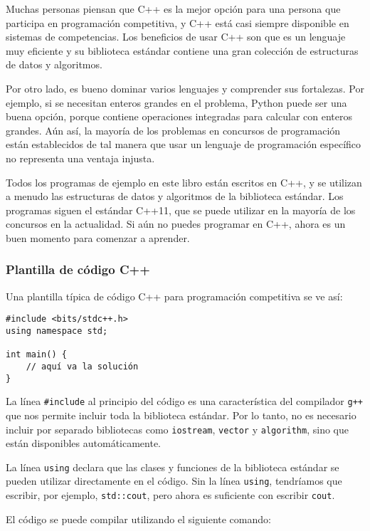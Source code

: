 Muchas personas piensan que C++ es la mejor opción
para una persona que participa en programación competitiva,
y C++ está casi siempre disponible en
sistemas de competencias.
Los beneficios de usar C++ son que
es un lenguaje muy eficiente y
su biblioteca estándar contiene una
gran colección
de estructuras de datos y algoritmos.

Por otro lado, es bueno
dominar varios lenguajes y comprender
sus fortalezas.
Por ejemplo, si se necesitan enteros grandes
en el problema,
Python puede ser una buena opción, porque
contiene operaciones integradas para
calcular con enteros grandes.
Aún así, la mayoría de los problemas en concursos de programación
están establecidos de tal manera que
usar un lenguaje de programación específico
no representa una ventaja injusta.

Todos los programas de ejemplo en este libro están escritos en C++,
y se utilizan a menudo las estructuras de datos y algoritmos
de la biblioteca estándar.
Los programas siguen el estándar C++11,
que se puede utilizar en la mayoría de los concursos en la actualidad.
Si aún no puedes programar en C++,
ahora es un buen momento para comenzar a aprender.

\subsubsection{Plantilla de código C++}

Una plantilla típica de código C++ para programación competitiva
se ve así:

\begin{lstlisting}
#include <bits/stdc++.h>
using namespace std;

int main() {
    // aquí va la solución
}
\end{lstlisting}

La línea \texttt{\#include} al principio
del código es una característica del compilador \texttt{g++}
que nos permite incluir toda la biblioteca estándar.
Por lo tanto, no es necesario incluir por separado
bibliotecas como \texttt{iostream},
\texttt{vector} y \texttt{algorithm},
sino que están disponibles automáticamente.

La línea \texttt{using} declara
que las clases y funciones
de la biblioteca estándar se pueden utilizar directamente
en el código.
Sin la línea \texttt{using}, tendríamos
que escribir, por ejemplo, \texttt{std::cout},
pero ahora es suficiente con escribir \texttt{cout}.

El código se puede compilar utilizando el siguiente comando:

